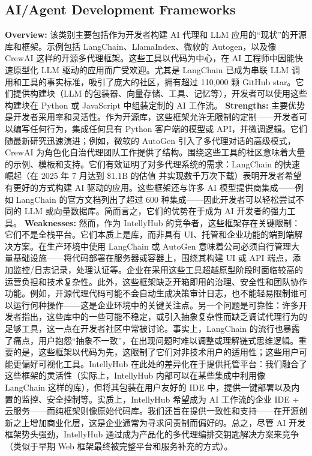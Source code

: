 \documentclass[11pt, a4paper, oneside]{article}
\begin{document}
\subsection{AI/Agent Development Frameworks}
\textbf{Overview:} 该类别主要包括作为开发者构建 AI 代理和 LLM 应用的“现状”的开源库和框架。示例包括 LangChain、LlamaIndex、微软的 Autogen，以及像 CrewAI 这样的开源多代理框架。这些工具以代码为中心，在 AI 工程师中因能快速原型化 LLM 驱动的应用而广受欢迎。尤其是 LangChain 已成为串联 LLM 调用和工具的事实标准，吸引了庞大的社区，拥有超过 110,000 颗 GitHub star\cite{langchainGitHub}。它们提供构建块（LLM 的包装器、向量存储、工具、记忆等），开发者可以使用这些构建块在 Python 或 JavaScript 中组装定制的 AI 工作流。
\newline\newline
\textbf{Strengths:} 主要优势是开发者采用率和灵活性。作为开源库，这些框架允许无限制的定制——开发者可以编写任何行为，集成任何具有 Python 客户端的模型或 API，并微调逻辑。它们随最新研究迅速演进；例如，微软的 AutoGen 引入了多代理对话的高级模式\cite{autogenGitHub}，CrewAI 为角色化自治代理团队工作提供了结构\cite{crewaiGitHub}。围绕这些工具的社区意味着大量的示例、模板和支持。它们有效证明了对多代理系统的需求：LangChain 的快速崛起（在 2025 年 7 月达到 \$1.1B 的估值\cite{langchainValuation} 并实现数千万次下载）表明开发者希望有更好的方式构建 AI 驱动的应用。这些框架还与许多 AI 模型提供商集成——例如 LangChain 的官方文档列出了超过 600 种集成\cite{langchainIntegrations}——因此开发者可以轻松尝试不同的 LLM 或向量数据库。简而言之，它们的优势在于成为 AI 开发者的强力工具。
\newline\newline
\textbf{Weaknesses:} 然而，作为 IntellyHub 的竞争者，这些框架存在关键限制：它们不是全栈平台。它们本质上是库，而非具有 UI、托管和企业功能的端到端解决方案。在生产环境中使用 LangChain 或 AutoGen 意味着公司必须自行管理大量基础设施——将代码部署在服务器或容器上，围绕其构建 UI 或 API 端点，添加监控/日志记录，处理认证等。企业在采用这些工具超越原型阶段时面临较高的运营负担和技术复杂性。此外，这些框架缺乏开箱即用的治理、安全性和团队协作功能。例如，开源代理代码可能不会自动生成决策审计日志，也不能轻易限制谁可以运行何种操作——这是企业环境中的关键关注点。另一个问题是可靠性：许多开发者指出，这些库中的一些可能不稳定，或引入抽象复杂性而缺乏调试代理行为的足够工具，这一点在开发者社区中常被讨论\cite{langchainCritique}。事实上，LangChain 的流行也暴露了痛点，用户抱怨“抽象不一致”，在出现问题时难以调整或理解链式思维逻辑。重要的是，这些框架以代码为先，这限制了它们对非技术用户的适用性；这些用户可能更偏好可视化工具。IntellyHub 在此处的差异化在于提供托管平台：我们融合了这些框架的灵活性（实际上，IntellyHub 内部可以在某些集成中利用像 LangChain 这样的库），但将其包装在用户友好的 IDE 中，提供一键部署以及内置的监控、安全控制等。实质上，IntellyHub 希望成为 AI 工作流的企业 IDE + 云服务——而纯框架则像原始代码库。我们还旨在提供一致性和支持——在开源创新之上增加商业化层，这是企业通常为寻求问责制而偏好的。总之，尽管 AI 开发框架势头强劲，IntellyHub 通过成为产品化的多代理编排交钥匙解决方案来竞争（类似于早期 Web 框架最终被完整平台和服务补充的方式）。
\end{document}
